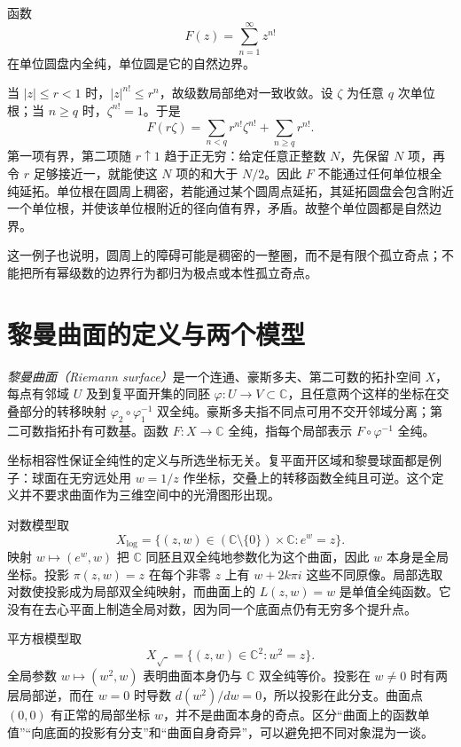 \begin{example}[不用间隙定理的自然边界例子]
\label{ex:ca-natural-boundary}
函数
\[
 F(z)=\sum_{n=1}^{\infty}z^{n!}
\]
在单位圆盘内全纯，单位圆是它的自然边界。
\end{example}
\begin{solve}
当 $|z|\le r<1$ 时，$|z|^{n!}\le r^n$，故级数局部绝对一致收敛。设 $\zeta$ 为任意 $q$ 次单位根；当 $n\ge q$ 时，$\zeta^{n!}=1$。于是
\[
 F(r\zeta)=\sum_{n<q}r^{n!}\zeta^{n!}+\sum_{n\ge q}r^{n!}.
\]
第一项有界，第二项随 $r\uparrow1$ 趋于正无穷：给定任意正整数 $N$，先保留 $N$ 项，再令 $r$ 足够接近一，就能使这 $N$ 项的和大于 $N/2$。因此 $F$ 不能通过任何单位根全纯延拓。单位根在圆周上稠密，若能通过某个圆周点延拓，其延拓圆盘会包含附近一个单位根，并使该单位根附近的径向值有界，矛盾。故整个单位圆都是自然边界。
\end{solve}

这一例子也说明，圆周上的障碍可能是稠密的一整圈，而不是有限个孤立奇点；不能把所有幂级数的边界行为都归为极点或本性孤立奇点。

\section{黎曼曲面的定义与两个模型}

\begin{definition}[黎曼曲面]
\emph{黎曼曲面（Riemann surface）}是一个连通、豪斯多夫、第二可数的拓扑空间 $X$，每点有邻域 $U$ 及到复平面开集的同胚 $\varphi:U\to V\subset\mathbb C$，且任意两个这样的坐标在交叠部分的转移映射 $\varphi_2\circ\varphi_1^{-1}$ 双全纯。豪斯多夫指不同点可用不交开邻域分离；第二可数指拓扑有可数基。函数 $F:X\to\mathbb C$ 全纯，指每个局部表示 $F\circ\varphi^{-1}$ 全纯。
\end{definition}

坐标相容性保证全纯性的定义与所选坐标无关。复平面开区域和黎曼球面都是例子：球面在无穷远处用 $w=1/z$ 作坐标，交叠上的转移函数全纯且可逆。这个定义并不要求曲面作为三维空间中的光滑图形出现。

对数模型取
\[
 X_{\log}=\{(z,w)\in(\mathbb C\setminus\{0\})\times\mathbb C:e^w=z\}.
\]
映射 $w\mapsto(e^w,w)$ 把 $\mathbb C$ 同胚且双全纯地参数化为这个曲面，因此 $w$ 本身是全局坐标。投影 $\pi(z,w)=z$ 在每个非零 $z$ 上有 $w+2k\pi i$ 这些不同原像。局部选取对数使投影成为局部双全纯映射，而曲面上的 $L(z,w)=w$ 是单值全纯函数。它没有在去心平面上制造全局对数，因为同一个底面点仍有无穷多个提升点。

平方根模型取
\[
 X_{\sqrt{\phantom z}}=\{(z,w)\in\mathbb C^2:w^2=z\}.
\]
全局参数 $w\mapsto(w^2,w)$ 表明曲面本身仍与 $\mathbb C$ 双全纯等价。投影在 $w\ne0$ 时有两层局部逆，而在 $w=0$ 时导数 $d(w^2)/dw=0$，所以投影在此分支。曲面点 $(0,0)$ 有正常的局部坐标 $w$，并不是曲面本身的奇点。区分“曲面上的函数单值”“向底面的投影有分支”和“曲面自身奇异”，可以避免把不同对象混为一谈。

